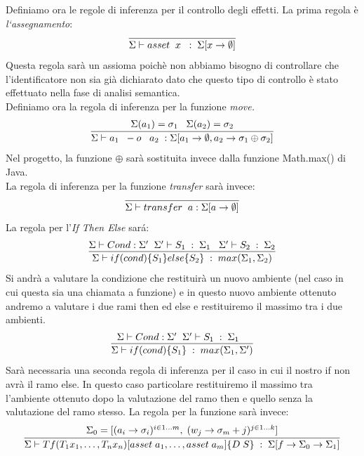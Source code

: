 \documentclass[12pt, a4paper]{report}
\begin{document}
Definiamo ora le regole di inferenza per il controllo degli effetti.
La prima regola è \emph{l`assegnamento}:
\[
\infer{\Sigma \vdash asset \;\; x\;\;:\;\Sigma[x\rightarrow \emptyset]}{}    
\]
Questa regola sarà un assioma poichè non abbiamo bisogno di controllare che l'identificatore non sia già dichiarato dato che questo tipo di controllo è stato effettuato nella fase di analisi semantica.\\
Definiamo ora la regola di inferenza per la funzione \emph{move.}
\[
\infer{\Sigma \vdash a_1\;\; -o\;\;\; a_2\; : \Sigma[a_1 \rightarrow \emptyset , a_2 \rightarrow \sigma_1 \oplus \sigma_2]}{
\Sigma(a_1) = \sigma_1 \;\;\; \Sigma(a_2) = \sigma_2 }    
\]
Nel progetto, la funzione $\oplus$ sarà sostituita invece dalla funzione Math.max() di Java.\\
La regola di inferenza per la funzione \emph{transfer} sarà invece:
\[
\infer{\Sigma \vdash transfer \;\;a : \Sigma[a \rightarrow \emptyset] }{}    
\]
La regola per l'\emph{If Then Else} sará:
\[
\infer{\Sigma \vdash if(cond)\{S_1\}else\{S_2\} \;:\;max(\Sigma_1,\Sigma_2)}{\Sigma \vdash Cond :\Sigma'\;\;\Sigma' \vdash S_1\;:\;\Sigma_1 \;\;\; \Sigma' \vdash S_2\;:\;\Sigma_2}
\]
Si andrà a valutare la condizione che restituirà un nuovo ambiente (nel caso in cui questa sia una chiamata a funzione) e in questo nuovo ambiente ottenuto andremo a valutare i due rami then ed else e restituiremo il massimo tra i due ambienti. 
\[
\infer{\Sigma \vdash if(cond)\{S_1\} \;:\;max(\Sigma_1,\Sigma')}{\Sigma \vdash Cond :\Sigma'\;\;\Sigma' \vdash S_1\;:\;\Sigma_1 \;\;\;}
\]
Sarà necessaria una seconda regola di inferenza per il caso in cui il nostro if non avrà il ramo else. In questo caso particolare restituiremo il massimo tra l'ambiente ottenuto dopo la valutazione del ramo then e quello senza la valutazione del ramo stesso. 
La regola per la funzione sarà invece:
\[
\infer{\Sigma\vdash T f(T_1x_1,\dots, T_n x_n)[asset\;a_1,\dots,asset\;a_m]\{D\;S\} \;:\; \Sigma[f \rightarrow \Sigma_0 \rightarrow \Sigma_1] }
{\Sigma_0 = [(a_i \rightarrow \sigma_i)^{i \in 1\dots m},\;(w_j \rightarrow \sigma_m+j)^{j \in 1 \dots k }]}
\]
\end{document}
